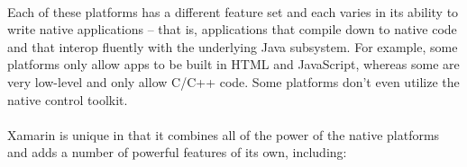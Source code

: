  \paragraph{}
 Each of these platforms has a different feature set and each varies in its ability to write native applications – that is, applications that compile down to native code and that interop fluently with the underlying Java subsystem. For example, some platforms only allow apps to be built in HTML and JavaScript, whereas some are very low-level and only allow C/C++ code. Some platforms don’t even utilize the native control toolkit.

\paragraph{}
 Xamarin is unique in that it combines all of the power of the native platforms and adds a number of powerful features of its own, including:


